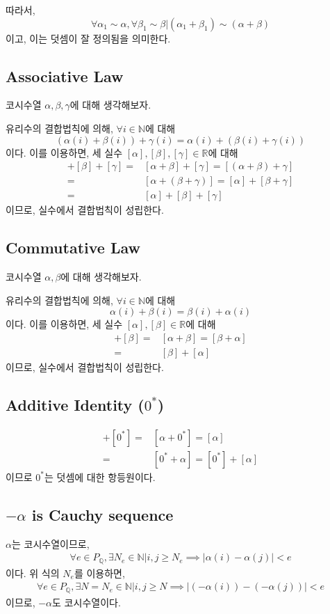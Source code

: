 \documentclass{article}
\begin{document}
따라서, $$\forall \alpha_1 \sim \alpha, \forall \beta_1 \sim \beta \bigg| (\alpha_1 + \beta_1) \sim (\alpha + \beta)$$이고, 이는 덧셈이 잘 정의됨을 의미한다.

\subsection{Associative Law}
코시수열 $\alpha, \beta, \gamma$에 대해 생각해보자.

유리수의 결합법칙에 의해, $\forall i \in \mathbb{N}$에 대해
$$ (\alpha(i) + \beta(i)) + \gamma(i) = \alpha(i) + (\beta(i) + \gamma(i)) $$
이다. 이를 이용하면, 세 실수 $[\alpha], [\beta], [\gamma] \in \mathbb{R}$에 대해
\begin{align*}
[\alpha] + [\beta] + [\gamma] =& [\alpha + \beta] + [\gamma]
= [(\alpha + \beta) + \gamma]\\
=& [\alpha + (\beta + \gamma)]
= [\alpha] + [\beta + \gamma]\\
=& [\alpha] + [\beta] + [\gamma]
\end{align*}
이므로, 실수에서 결합법칙이 성립한다.

\subsection{Commutative Law}
코시수열 $\alpha, \beta$에 대해 생각해보자.

유리수의 결합법칙에 의해, $\forall i \in \mathbb{N}$에 대해
$$ \alpha(i) + \beta(i) = \beta(i) + \alpha(i) $$
이다. 이를 이용하면, 세 실수 $[\alpha], [\beta] \in \mathbb{R}$에 대해
\begin{align*}
[\alpha] + [\beta] = & [\alpha + \beta] = [\beta + \alpha]\\
=& [\beta] + [\alpha]
\end{align*}
이므로, 실수에서 결합법칙이 성립한다.


\subsection{Additive Identity ($0^*$)}
\begin{align*}
[\alpha] + [0^*] = & [\alpha + 0^*] = [\alpha]\\
=& [0^*+ \alpha] = [0^*] + [\alpha]
\end{align*}
이므로 $0^*$는 덧셈에 대한 항등원이다.

\subsection{$-\alpha$ is Cauchy sequence}
$\alpha$는 코시수열이므로,
\begin{align*}
\forall e \in P_\mathbb{Q}, \exists N_e \in \mathbb{N} \bigg| i, j \ge N_e \implies \left| \alpha(i) - \alpha(j)  \right| < e
\end{align*}이다. 위 식의 $N_e$를 이용하면,
\begin{align*}
\forall e \in P_\mathbb{Q}, \exists N=N_e \in \mathbb{N} \bigg| i, j \ge N \implies \left| (-\alpha(i)) - (-\alpha(j))  \right| < e
\end{align*}이므로, $-\alpha$도 코시수열이다.
\end{document}
